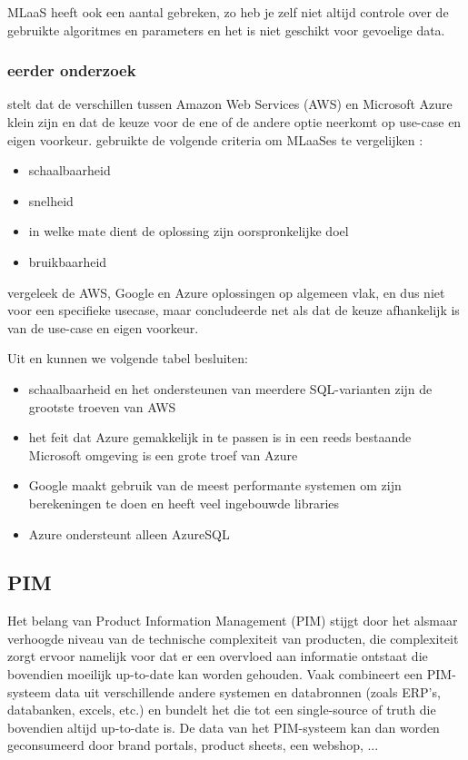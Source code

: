 MLaaS heeft ook een aantal gebreken, zo heb je zelf niet altijd controle over de gebruikte algoritmes en parameters en het is niet geschikt voor gevoelige data.

\subsubsection{eerder onderzoek}
\textcite{Madhuri2016} stelt dat de verschillen tussen Amazon Web Services (AWS) en Microsoft Azure klein zijn en dat de keuze voor de ene of de andere optie neerkomt op use-case en eigen voorkeur. \textcite{Pinto2018} gebruikte de volgende criteria om MLaaSes te vergelijken :
\begin{itemize}
	\item schaalbaarheid
	\item snelheid
	\item in welke mate dient de oplossing zijn oorspronkelijke doel
	\item bruikbaarheid
\end{itemize}
\textcite{Pallavi2020} vergeleek de AWS, Google en Azure oplossingen op algemeen vlak, en dus niet voor een specifieke usecase, maar concludeerde net als \textcite{Madhuri2016} dat de keuze afhankelijk is van de use-case en eigen voorkeur.

Uit \textcite{Pallavi2020} en \textcite{Madhuri2016} kunnen we volgende tabel besluiten: 
\begin{itemize}
	\item schaalbaarheid en het ondersteunen van meerdere SQL-varianten zijn de grootste troeven van AWS
	\item het feit dat Azure gemakkelijk in te passen is in een reeds bestaande Microsoft omgeving is een grote troef van Azure
	\item Google maakt gebruik van de meest performante systemen om zijn berekeningen te doen en heeft veel ingebouwde libraries
	\item Azure ondersteunt alleen AzureSQL
\end{itemize}


\subsection{PIM}
Het belang van Product Information Management (PIM) stijgt door het alsmaar verhoogde niveau van de technische complexiteit  van producten, die complexiteit zorgt ervoor namelijk voor dat er een overvloed aan informatie ontstaat die bovendien moeilijk up-to-date kan worden gehouden. \autocite{Fr_mling_2006} Vaak combineert een PIM-systeem data uit verschillende andere systemen en databronnen (zoals ERP's, databanken, excels, etc.) en bundelt het die tot een single-source of truth die bovendien altijd up-to-date is. De data van het PIM-systeem kan dan worden geconsumeerd door brand portals, product sheets, een webshop, ...




